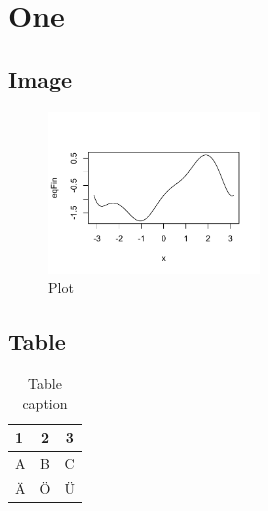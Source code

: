 \chapter{One}
\blindtext \autocite{demo0815}

\section{Image}
\begin{figure}[hbt]
	\centering
  \includegraphics[width=0.5\textwidth]{img/Rplot}
  \caption{Plot}
\end{figure}

\section{Table}
\begin{table}[hbt]
  \begin{tabular}{l|cc}
    1 & 2 & 3\\
    \hline
    A & B & C\\
    Ä & Ö & Ü
  \end{tabular}
  \caption{Table caption}
\end{table}

